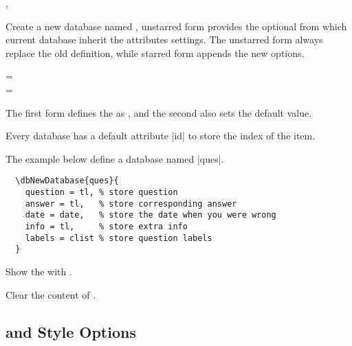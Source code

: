 \documentclass[full]{l3doc}
\def\orbar{\textup{\textbar}}
\begin{document}
\begin{documentation}
\begin{function}[added=2022-01-05]{\dbNewDatabase, \dbNewDatabase*}
\end{function}

Create a new database named , unstarred form provides the optional
 from which current database inherit the attributes settings.
The unstarred form always replace the old definition, while starred form
appends the new options.

\begin{syntax}
   =  \\
   = \orbar{}
\end{syntax}

The first form defines the  as , and the second also
sets the default value.

\begin{note}
  Every database has a default attribute |id| to store the index of the item.
\end{note}

The example below define a database named |ques|.
\begin{verbatim}
  \dbNewDatabase{ques}{
    question = tl, % store question
    answer = tl,   % store corresponding answer
    date = date,   % store the date when you were wrong
    info = tl,     % store extra info
    labels = clist % store question labels
  }
\end{verbatim}

\begin{function}[added=2022-01-05]{\dbshow}
  \begin{syntax}
      
  \end{syntax}

  Show the  with .
\end{function}

\begin{function}[added=2022-01-07]{\dbclear}
  \begin{syntax}
     
  \end{syntax}

  Clear the content of .
\end{function}

\subsection{ and Style Options}


\end{documentation}
\end{document}
